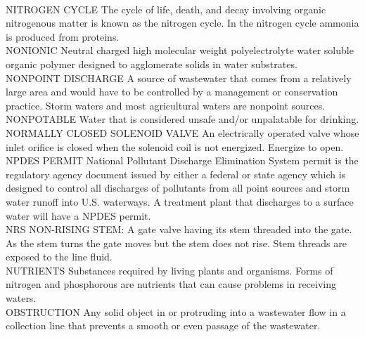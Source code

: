 \documentclass{article}
\begin{document}
\vspace{0.3cm}\\
NITROGEN CYCLE
The cycle of life, death, and decay involving organic nitrogenous matter is known as the nitrogen cycle. In the nitrogen cycle ammonia is produced from proteins.
\vspace{0.3cm}\\
NONIONIC
Neutral charged high molecular weight polyelectrolyte water soluble organic polymer designed to agglomerate solids in water substrates.
\vspace{0.3cm}\\
NONPOINT DISCHARGE
A source of wastewater that comes from a relatively large area and would have to be controlled by a management or conservation practice. Storm waters and most agricultural waters are nonpoint sources.
\vspace{0.3cm}\\
NONPOTABLE
Water that is considered unsafe and/or unpalatable for drinking.
\vspace{0.3cm}\\
NORMALLY CLOSED SOLENOID VALVE
An electrically operated valve whose inlet orifice is closed when the solenoid coil is not energized. Energize to open.
\vspace{0.3cm}\\
NPDES PERMIT
National Pollutant Discharge Elimination System permit is the regulatory agency document issued by either a federal or state agency which is designed to control all discharges of pollutants from all point sources and storm water runoff into U.S. waterways. A treatment plant that discharges to a surface water will have a NPDES permit.
\vspace{0.3cm}\\
NRS
NON-RISING STEM:  A gate valve having its stem threaded into the gate. As the stem turns the gate moves but the stem does not rise. Stem threads are exposed to the line fluid.
\vspace{0.3cm}\\
NUTRIENTS
Substances required by living plants and organisms. Forms of nitrogen and phosphorous are nutrients that can cause problems in receiving waters.
\vspace{0.3cm}\\
OBSTRUCTION
Any solid object in or protruding into a wastewater flow in a collection line that prevents a smooth or even passage of the wastewater. 
\vspace{0.3cm}\\
\end{document}
